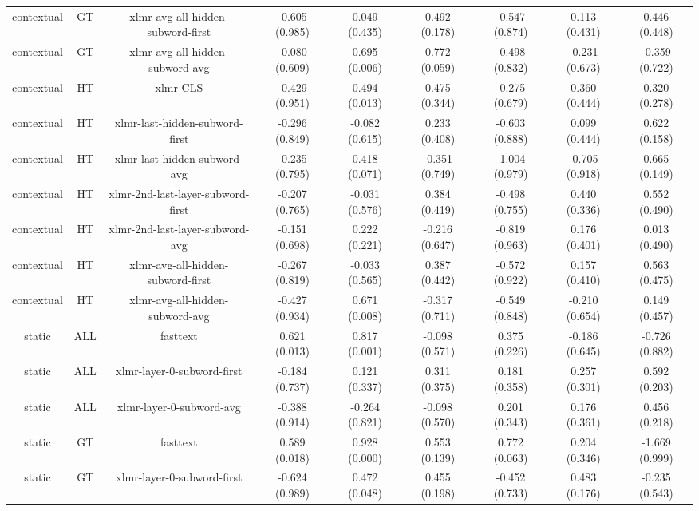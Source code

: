 \begin{sidewaystable}[htb]
\begin{tabular}{@{}ccccccccc@{}}
        contextual & GT & xlmr-avg-all-hidden-subword-first & -0.605 (0.985) & 0.049 (0.435) & 0.492 (0.178) & -0.547 (0.874) & 0.113 (0.431) & 0.446 (0.448) \\
        contextual & GT & xlmr-avg-all-hidden-subword-avg & -0.080 (0.609) & 0.695 (0.006) & 0.772 (0.059) & -0.498 (0.832) & -0.231 (0.673) & -0.359 (0.722) \\
        contextual & HT & xlmr-CLS & -0.429 (0.951) & 0.494 (0.013) & 0.475 (0.344) & -0.275 (0.679) & 0.360 (0.444) & 0.320 (0.278) \\
        contextual & HT & xlmr-last-hidden-subword-first & -0.296 (0.849) & -0.082 (0.615) & 0.233 (0.408) & -0.603 (0.888) & 0.099 (0.444) & 0.622 (0.158) \\
        contextual & HT & xlmr-last-hidden-subword-avg & -0.235 (0.795) & 0.418 (0.071) & -0.351 (0.749) & -1.004 (0.979) & -0.705 (0.918) & 0.665 (0.149) \\
        contextual & HT & xlmr-2nd-last-layer-subword-first & -0.207 (0.765) & -0.031 (0.576) & 0.384 (0.419) & -0.498 (0.755) & 0.440 (0.336) & 0.552 (0.490) \\
        contextual & HT & xlmr-2nd-last-layer-subword-avg & -0.151 (0.698) & 0.222 (0.221) & -0.216 (0.647) & -0.819 (0.963) & 0.176 (0.401) & 0.013 (0.490) \\
        contextual & HT & xlmr-avg-all-hidden-subword-first & -0.267 (0.819) & -0.033 (0.565) & 0.387 (0.442) & -0.572 (0.922) & 0.157 (0.410) & 0.563 (0.475) \\
        contextual & HT & xlmr-avg-all-hidden-subword-avg & -0.427 (0.934) & 0.671 (0.008) & -0.317 (0.711) & -0.549 (0.848) & -0.210 (0.654) & 0.149 (0.457) \\
        static & ALL & fasttext & 0.621 (0.013) & 0.817 (0.001) & -0.098 (0.571) & 0.375 (0.226) & -0.186 (0.645) & -0.726 (0.882) \\
        static & ALL & xlmr-layer-0-subword-first & -0.184 (0.737) & 0.121 (0.337) & 0.311 (0.375) & 0.181 (0.358) & 0.257 (0.301) & 0.592 (0.203) \\
        static & ALL & xlmr-layer-0-subword-avg & -0.388 (0.914) & -0.264 (0.821) & -0.098 (0.570) & 0.201 (0.343) & 0.176 (0.361) & 0.456 (0.218) \\
        static & GT & fasttext & 0.589 (0.018) & 0.928 (0.000) & 0.553 (0.139) & 0.772 (0.063) & 0.204 (0.346) & -1.669 (0.999) \\
        static & GT & xlmr-layer-0-subword-first & -0.624 (0.989) & 0.472 (0.048) & 0.455 (0.198) & -0.452 (0.733) & 0.483 (0.176) & -0.235 (0.543) \\

\end{tabular}
\end{sidewaystable}
